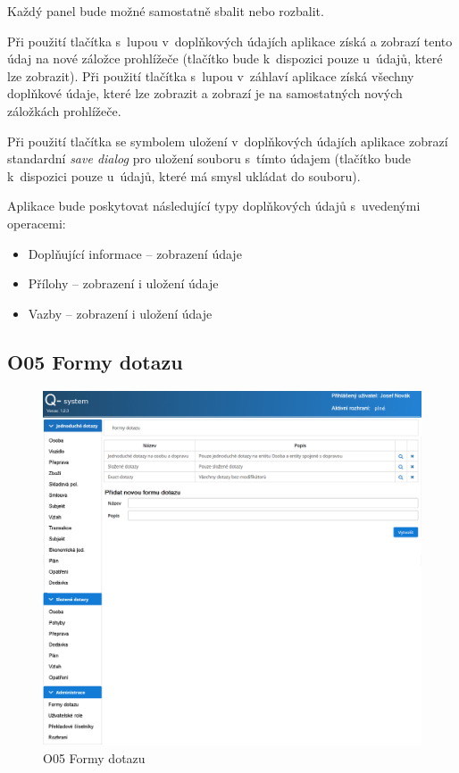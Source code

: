 \documentclass[thesis=M,czech]{FITthesis}[2019/12/23]
\begin{document}
Každý panel bude možné samostatně sbalit nebo rozbalit.

Při použití tlačítka s~lupou v~doplňkových údajích aplikace získá a zobrazí tento údaj na nové záložce prohlížeče (tlačítko bude k~dispozici pouze u~údajů, které lze zobrazit). Při použití tlačítka s~lupou v~záhlaví  aplikace získá všechny doplňkové údaje, které lze zobrazit a zobrazí je na samostatných nových záložkách prohlížeče.

Při použití tlačítka se symbolem uložení v~doplňkových údajích aplikace zobrazí standardní \textit{save dialog} pro uložení souboru s~tímto údajem (tlačítko bude k~dispozici pouze u~údajů, které má smysl ukládat do souboru).

Aplikace bude poskytovat následující typy doplňkových údajů s~uvedenými operacemi:
\begin{itemize}
	\item Doplňující informace -- zobrazení údaje
	\item Přílohy -- zobrazení i uložení údaje
	\item Vazby -- zobrazení i uložení údaje
\end{itemize}

\subsection{O05 Formy dotazu}
\label{O05FormyDotazu}
\begin{figure}[H]
  \centering
  \includegraphics[width=\textwidth]{res/screens/O05 Formy dotazu.png}
  \caption{O05 Formy dotazu}
  \label{fig:O05 Formy dotazu}
\end{figure}
\end{document}
